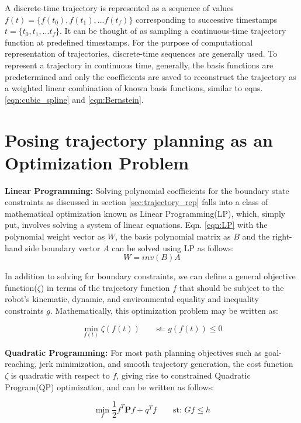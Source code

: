 A discrete-time trajectory is represented as a sequence of values $f(t) = \{f(t_0), f(t_1), ... f(t_f)\}$ corresponding to successive timestamps $t = \{t_0, t_1, ... t_f\}$. It can be thought of as sampling a continuous-time trajectory function at predefined timestamps. For the purpose of computational representation of trajectories, discrete-time sequences are generally used. To represent a trajectory in continuous time, generally, the basis functions are predetermined and only the coefficients are saved to reconstruct the trajectory as a weighted linear combination of known basis functions, similar to eqns. \ref{eqn:cubic_spline} and \ref{eqn:Bernstein}.


\section{Posing trajectory planning as an Optimization Problem}
\label{sec:optimization-intro}
\textbf{Linear Programming:}
Solving polynomial coefficients for the boundary state constraints as discussed in section \ref{sec:trajectory_rep} falls into a class of mathematical optimization known as Linear Programming(LP), which, simply put, involves solving a system of linear equations. Eqn. \ref{eqn:LP} with the polynomial weight vector as $W$, the basis polynomial matrix as $B$ and the right-hand side boundary vector $A$ can be solved using LP as follows:
\begin{equation}
    W = inv({B})A
\end{equation}

In addition to solving for boundary constraints, we can define a general objective function($\zeta$) in terms of the trajectory function $f$ that should be subject to the robot's kinematic, dynamic, and environmental equality and inequality constraints $g$. Mathematically, this optimization problem may be written as:

\begin{equation}
\min_{f(t)} \zeta(f(t)) \qquad \text{st: } g(f(t)) \leq 0
\end{equation}


\textbf{Quadratic Programming:}
For most path planning objectives such as goal-reaching, jerk minimization, and smooth trajectory generation, the cost function $\zeta$ is quadratic with respect to $f$, giving rise to constrained Quadratic Program(QP) optimization, and can be written as follows:


\begin{equation}
\min_{f} \frac{1}{2}f^{T}\boldsymbol{P}f + q^{T}f \qquad
 \text{st: }  Gf \leq h\label{eqn:QP}
\end{equation}

